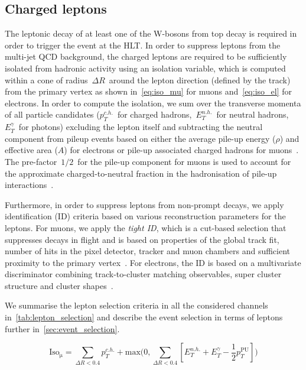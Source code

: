 \subsection{Charged leptons}
\label{sec:object_id_lep}

The leptonic decay of at least one of the W-bosons from top decay is required in order to trigger the event at the HLT. In order to suppress leptons from the multi-jet QCD background, the charged leptons are required to be sufficiently isolated from hadronic activity using an isolation variable, which is computed within a cone of radius~$\Delta R$~around the lepton direction (defined by the track) from the primary vertex as shown in~\cref{eq:iso_mu} for muons and~\cref{eq:iso_el} for electrons. In order to compute the isolation, we sum over the transverse momenta of all particle candidates ($p_T^{c.h.}$~for charged hadrons,~$E_T^{n.h.}$~for neutral hadrons,~$E_T^{\gamma}$~for photons) excluding the lepton itself and subtracting the neutral component from pileup events based on either the average pile-up energy ($\rho$) and effective area ($A$) for electrons or pile-up associated charged hadrons for muons~\cite{Cacciari:2007fd}. The pre-factor~$1/2$~for the pile-up component for muons is used to account for the approximate charged-to-neutral fraction in the hadronisation of pile-up interactions~\cite{CMS:2012}.

Furthermore, in order to suppress leptons from non-prompt decays, we apply identification (ID) criteria based on various reconstruction parameters for the leptons. For muons, we apply the \textit{tight ID}, which is a cut-based selection that suppresses decays in flight and is based on properties of the global track fit, number of hits in the pixel detector, tracker and muon chambers and sufficient proximity to the primary vertex~\cite{Chatrchyan:2012xi,CMS:2017_muon_pog}. For electrons, the ID is based on a multivariate discriminator combining track-to-cluster matching observables, super cluster structure and cluster shapes~\cite{Khachatryan:2015hwa,CMS:2017_egamma_pog}.

We summarise the lepton selection criteria in all the considered channels in~\cref{tab:lepton_selection} and describe the event selection in terms of leptons further in~\cref{sec:event_selection}.

\begin{equation}
\label{eq:iso_mu}
\mathrm{Iso}_{\mathrm{\mu}} = \sum_{\Delta R < 0.4} p_T^{c.h.} + \mathrm{max}\biggl(0, \sum_{\Delta R < 0.4} [E_T^{n.h.} + E_T^{\gamma} - \frac{1}{2} p_T^{\mathrm{PU}}] \biggr)
\end{equation}


